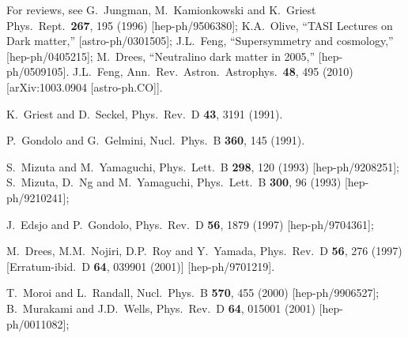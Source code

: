 \documentclass[11pt]{article}
\begin{document}
\begin{thebibliography}{999}
 For reviews, see
G.~Jungman, M.~Kamionkowski and K.~Griest   
  Phys.\ Rept.\  {\bf 267}, 195 (1996)
  [hep-ph/9506380];
K.A.~Olive,
  ``TASI Lectures on Dark matter,''
  [astro-ph/0301505];
J.L.~Feng,
  ``Supersymmetry and cosmology,'' 
  [hep-ph/0405215];
M.~Drees,
  ``Neutralino dark matter in 2005,''
  [hep-ph/0509105].
J.L.~Feng,
  Ann.\ Rev.\ Astron.\ Astrophys.\  {\bf 48}, 495 (2010)
  [arXiv:1003.0904 [astro-ph.CO]].

K.~Griest and D.~Seckel,
  Phys.\ Rev.\ D {\bf 43}, 3191 (1991).

  P.~Gondolo and G.~Gelmini,
  Nucl.\ Phys.\ B {\bf 360}, 145 (1991).

S.~Mizuta and M.~Yamaguchi,
  Phys.\ Lett.\ B {\bf 298}, 120 (1993)
  [hep-ph/9208251];
S.~Mizuta, D.~Ng and M.~Yamaguchi,
  Phys.\ Lett.\ B {\bf 300}, 96 (1993)
  [hep-ph/9210241];

J.~Edsjo and P.~Gondolo,
  Phys.\ Rev.\ D {\bf 56}, 1879 (1997)
  [hep-ph/9704361];

M.~Drees, M.M.~Nojiri, D.P.~Roy and Y.~Yamada,
  Phys.\ Rev.\ D {\bf 56}, 276 (1997)
  [Erratum-ibid.\ D {\bf 64}, 039901 (2001)]
  [hep-ph/9701219].
  
T.~Moroi and L.~Randall,
  Nucl.\ Phys.\ B {\bf 570}, 455 (2000)
  [hep-ph/9906527];
B.~Murakami and J.D.~Wells,
  Phys.\ Rev.\ D {\bf 64}, 015001 (2001)
  [hep-ph/0011082];


\end{thebibliography}
\end{document}
